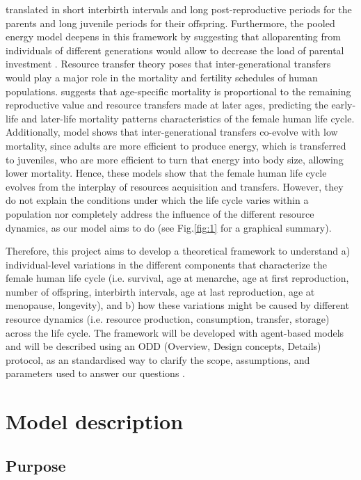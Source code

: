\documentclass{article}
\begin{document}
translated in short interbirth intervals and long post-reproductive periods for the parents and long juvenile periods for their offspring. Furthermore, the pooled energy model deepens in this framework by suggesting that alloparenting from individuals of different generations would allow to decrease the load of parental investment \citep{kramer2010pooled}. Resource transfer theory poses that inter-generational transfers would play a major role in the mortality and fertility schedules of human populations. \cite{lee2003rethinking} suggests that age-specific mortality is proportional to the remaining reproductive value and resource transfers made at later ages, predicting the early-life and later-life mortality patterns characteristics of the female human life cycle. Additionally, \cite{chu2006co} model shows that inter-generational transfers co-evolve with low mortality, since adults are more efficient to produce energy, which is transferred to juveniles, who are more efficient to turn that energy into body size, allowing lower mortality. Hence, these models show that the female human life cycle evolves from the interplay of resources acquisition and transfers. However, they do not explain the conditions under which the life cycle varies within a population nor completely address the influence of the different resource dynamics, as our model aims to do (see Fig.\ref{fig:1} for a graphical summary).

Therefore, this project aims to develop a theoretical framework to understand a) individual-level variations in the different components that characterize the female human life cycle (i.e. survival, age at menarche, age at first reproduction, number of offspring, interbirth intervals, age at last reproduction, age at menopause, longevity), and b) how these variations might be caused by different resource dynamics (i.e. resource production, consumption, transfer, storage) across the life cycle. The framework will be developed with agent-based models and will be described using an ODD (Overview, Design concepts, Details) protocol, as an standardised way to clarify the scope, assumptions, and parameters used to answer our questions \citep{grimm2006standard,grimm2020odd}.

\section{Model description}

\subsection{Purpose}
\end{document}
